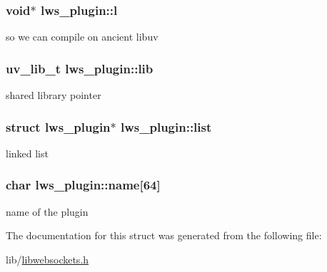 \subsubsection[{\texorpdfstring{l}{l}}]{\setlength{\rightskip}{0pt plus 5cm}void$\ast$ lws\+\_\+plugin\+::l}\hypertarget{structlws__plugin_a4ef37a43653715b6c69cbf8a7be747f4}{}\label{structlws__plugin_a4ef37a43653715b6c69cbf8a7be747f4}
so we can compile on ancient libuv 
\subsubsection[{\texorpdfstring{lib}{lib}}]{\setlength{\rightskip}{0pt plus 5cm}uv\+\_\+lib\+\_\+t lws\+\_\+plugin\+::lib}\hypertarget{structlws__plugin_af9e1042dc1de5b9d202c2f5fd1834330}{}\label{structlws__plugin_af9e1042dc1de5b9d202c2f5fd1834330}
shared library pointer 
\subsubsection[{\texorpdfstring{list}{list}}]{\setlength{\rightskip}{0pt plus 5cm}struct {\bf lws\+\_\+plugin}$\ast$ lws\+\_\+plugin\+::list}\hypertarget{structlws__plugin_a65dffd68fd267ce17b988790d1d35f22}{}\label{structlws__plugin_a65dffd68fd267ce17b988790d1d35f22}
linked list 
\subsubsection[{\texorpdfstring{name}{name}}]{\setlength{\rightskip}{0pt plus 5cm}char lws\+\_\+plugin\+::name\mbox{[}64\mbox{]}}\hypertarget{structlws__plugin_af4ac8fcb79e10e0c2d960e1804d98105}{}\label{structlws__plugin_af4ac8fcb79e10e0c2d960e1804d98105}
name of the plugin 

The documentation for this struct was generated from the following file\+:\begin{DoxyCompactItemize}
\item 
lib/\hyperlink{libwebsockets_8h}{libwebsockets.\+h}\end{DoxyCompactItemize}

